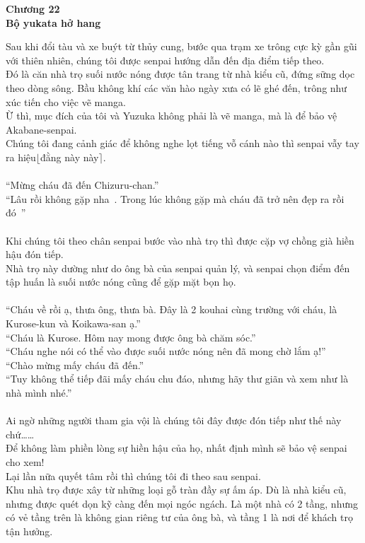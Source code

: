 \documentclass[12pt,a4paper, twosides]{book}
\begin{document}
    \begin{center}
    \textbf{\large Chương 22 \\ Bộ yukata hở hang}
    \end{center}
    \noindent
Sau khi đổi tàu và xe buýt từ thủy cung, bước qua trạm xe trông cực kỳ gần gũi với thiên nhiên, chúng tôi được senpai hướng dẫn đến địa điểm tiếp theo.\\
Đó là căn nhà trọ suối nước nóng được tân trang từ nhà kiểu cũ, đứng sững dọc theo dòng sông. Bầu không khí các văn hào ngày xưa có lẽ ghé đến, trông như xúc tiến cho việc vẽ manga.\\
Ừ thì, mục đích của tôi và Yuzuka không phải là vẽ manga, mà là để bảo vệ Akabane-senpai.\\
Chúng tôi đang cảnh giác để không nghe lọt tiếng vỗ cánh nào thì senpai vẫy tay ra hiệu$\lfloor$đằng này này$\rceil$.\\
\\
“Mừng cháu đã đến Chizuru-chan.”\\
“Lâu rồi không gặp nha~. Trong lúc không gặp mà cháu đã trở nên đẹp ra rồi đó~”\\
\\
Khi chúng tôi theo chân senpai bước vào nhà trọ thì được cặp vợ chồng già hiền hậu đón tiếp.\\
Nhà trọ này dường như do ông bà của senpai quản lý, và senpai chọn điểm đến tập huấn là suối nước nóng cũng để gặp mặt bọn họ.\\
\\
“Cháu về rồi ạ, thưa ông, thưa bà. Đây là 2 kouhai cùng trường với cháu, là Kurose-kun và Koikawa-san ạ.”\\
“Cháu là Kurose. Hôm nay mong được ông bà chăm sóc.”\\
“Cháu nghe nói có thể vào được suối nước nóng nên đã mong chờ lắm ạ!”\\
“Chào mừng mấy cháu đã đến.”\\
“Tuy không thể tiếp đãi mấy cháu chu đáo, nhưng hãy thư giãn và xem như là nhà mình nhé.”\\
\\
Ai ngờ những người tham gia vội là chúng tôi đây được đón tiếp như thế này chứ……\\
Để không làm phiền lòng sự hiền hậu của họ, nhất định mình sẽ bảo vệ senpai cho xem!\\
Lại lần nữa quyết tâm rồi thì chúng tôi đi theo sau senpai.\\
Khu nhà trọ được xây từ những loại gỗ tràn đầy sự ấm áp. Dù là nhà kiểu cũ, nhưng được quét dọn kỹ càng đến mọi ngóc ngách. Là một nhà có 2 tầng, nhưng có vẻ tầng trên là không gian riêng tư của ông bà, và tầng 1 là nơi để khách trọ tận hưởng.\\
\end{document}

